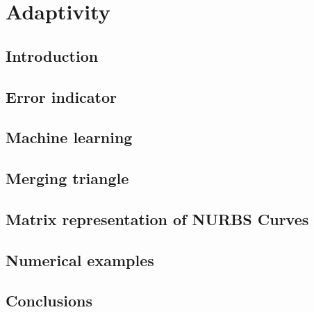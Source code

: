 
\chapter{Adaptivity}
\label{adp_sec:main}
\section{Introduction}


\section{Error indicator}
\label{adap_sec:error_indicator}


\section{Machine learning}



\section{Merging triangle}
\label{adap_merge_triangle}




\section{Matrix representation of NURBS Curves}
\label{adap_sec_mrep2d}



\section{Numerical examples}




\section{Conclusions}
